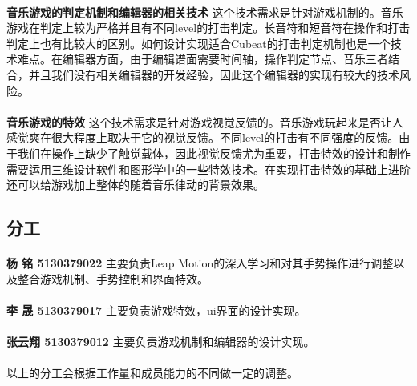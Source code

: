 \documentclass{article}
\begin{document}
\paragraph{}
\textbf{音乐游戏的判定机制和编辑器的相关技术}
这个技术需求是针对游戏机制的。音乐游戏在判定上较为严格并且有不同level的打击判定。长音符和短音符在操作和打击判定上也有比较大的区别。如何设计实现适合Cubeat的打击判定机制也是一个技术难点。在编辑器方面，由于编辑谱面需要时间轴，操作判定节点、音乐三者结合，并且我们没有相关编辑器的开发经验，因此这个编辑器的实现有较大的技术风险。
\paragraph{}
\textbf{音乐游戏的特效}
这个技术需求是针对游戏视觉反馈的。音乐游戏玩起来是否让人感觉爽在很大程度上取决于它的视觉反馈。不同level的打击有不同强度的反馈。由于我们在操作上缺少了触觉载体，因此视觉反馈尤为重要，打击特效的设计和制作需要运用三维设计软件和图形学中的一些特效技术。在实现打击特效的基础上进阶还可以给游戏加上整体的随着音乐律动的背景效果。
\subsection{分工}
\paragraph{}
\textbf{杨 铭 5130379022}
主要负责Leap Motion的深入学习和对其手势操作进行调整以及整合游戏机制、手势控制和界面特效。
\paragraph{}
\textbf{李 晟 5130379017}
主要负责游戏特效，ui界面的设计实现。
\paragraph{}
\textbf{张云翔 5130379012}
主要负责游戏机制和编辑器的设计实现。
\paragraph{}
以上的分工会根据工作量和成员能力的不同做一定的调整。
\end{document}
